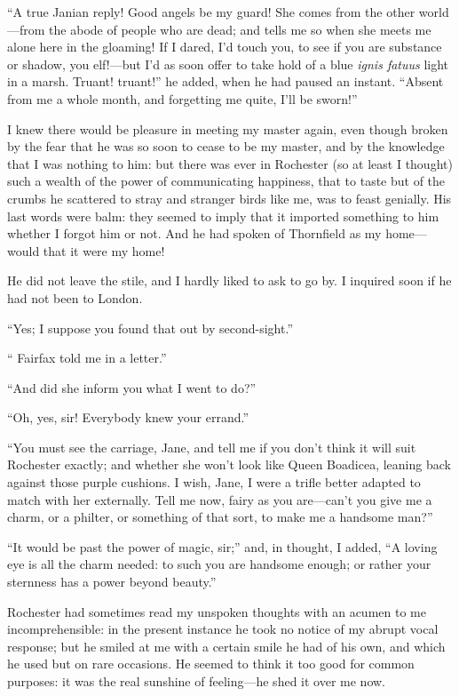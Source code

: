 \enquote{A true Janian reply! Good angels be my guard! She comes from the
other world---from the abode of people who are dead; and tells me so
when she meets me alone here in the gloaming! If I dared, I'd touch
you, to see if you are substance or shadow, you elf!---but I'd as soon
offer to take hold of a blue \emph{ignis fatuus} light in a marsh. 
Truant! truant!} he added, when he had paused an instant. 
\enquote{Absent from me a whole month, and forgetting me quite, I'll be
sworn!}

I knew there would be pleasure in meeting my master again, even though
broken by the fear that he was so soon to cease to be my master, and by
the knowledge that I was nothing to him: but there was ever in \Mr{}
 Rochester (so at least I thought) such a wealth of the power of
communicating happiness, that to taste but of the crumbs he scattered to
stray and stranger birds like me, was to feast genially. His last words
were balm: they seemed to imply that it imported something to him
whether I forgot him or not. And he had spoken of Thornfield as my
home---would that it were my home!

He did not leave the stile, and I hardly liked to ask to go by. I
inquired soon if he had not been to London.

\enquote{Yes; I suppose you found that out by second-sight.}

\enquote{\Mrs{} Fairfax told me in a letter.}

\enquote{And did she inform you what I went to do?}

\enquote{Oh, yes, sir! Everybody knew your errand.}

\enquote{You must see the carriage, Jane, and tell me if you don't think
it will suit \Mrs{} Rochester exactly; and whether she won't look like
Queen Boadicea, leaning back against those purple cushions. I wish,
Jane, I were a trifle better adapted to match with her externally. Tell
me now, fairy as you are---can't you give me a charm, or a philter, or
something of that sort, to make me a handsome man?}

\enquote{It would be past the power of magic, sir;} and, in thought, I
added, \enquote{A loving eye is all the charm needed: to such you are
handsome enough; or rather your sternness has a power beyond beauty.}

\Mr{} Rochester had sometimes read my unspoken thoughts with an acumen to
me incomprehensible: in the present instance he took no notice of my
abrupt vocal response; but he smiled at me with a certain smile he had
of his own, and which he used but on rare occasions. He seemed to think
it too good for common purposes: it was the real sunshine of
feeling---he shed it over me now.

